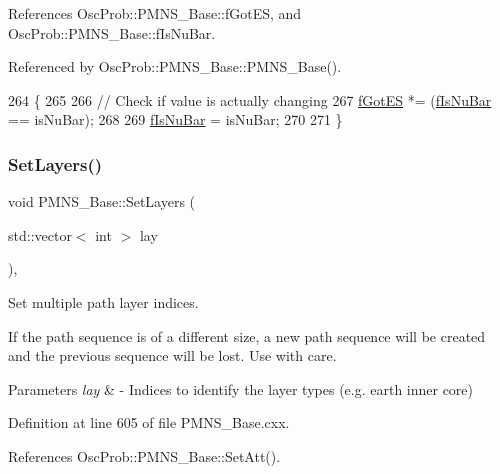 References Osc\+Prob\+::\+P\+M\+N\+S\+\_\+\+Base\+::f\+Got\+ES, and Osc\+Prob\+::\+P\+M\+N\+S\+\_\+\+Base\+::f\+Is\+Nu\+Bar.



Referenced by Osc\+Prob\+::\+P\+M\+N\+S\+\_\+\+Base\+::\+P\+M\+N\+S\+\_\+\+Base().


\begin{DoxyCode}
264 \{
265 
266   \textcolor{comment}{// Check if value is actually changing}
267   \hyperlink{classOscProb_1_1PMNS__Base_a6dc5cd010d2d70b2324745b4e53e9839}{fGotES} *= (\hyperlink{classOscProb_1_1PMNS__Base_a0ebaeaefab36a3ff381c6293faedfdd6}{fIsNuBar} == isNuBar);
268 
269   \hyperlink{classOscProb_1_1PMNS__Base_a0ebaeaefab36a3ff381c6293faedfdd6}{fIsNuBar} = isNuBar;
270 
271 \}
\end{DoxyCode}
\mbox{\label{classOscProb_1_1PMNS__Base_a904e580edf89fb98bf9a6397739b4ebe}} 
\subsubsection{\texorpdfstring{Set\+Layers()}{SetLayers()}}
{\footnotesize\ttfamily void P\+M\+N\+S\+\_\+\+Base\+::\+Set\+Layers (\begin{DoxyParamCaption}\item[{std\+::vector$<$ int $>$}]{lay }\end{DoxyParamCaption})\hspace{0.3cm}{\ttfamily [virtual]}, {\ttfamily [inherited]}}

Set multiple path layer indices.

If the path sequence is of a different size, a new path sequence will be created and the previous sequence will be lost. Use with care.


\begin{DoxyParams}{Parameters}
{\em lay} & -\/ Indices to identify the layer types (e.\+g. earth inner core) \\
\hline
\end{DoxyParams}


Definition at line 605 of file P\+M\+N\+S\+\_\+\+Base.\+cxx.



References Osc\+Prob\+::\+P\+M\+N\+S\+\_\+\+Base\+::\+Set\+Att().


